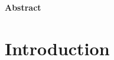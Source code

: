 \documentclass[12pt,twoside,openany]{book}
\begin{document}
\pagestyle{empty}

\begin{center}
    {\Large\bfseries Abstract}
\end{center}

\vspace{1cm}



\clearpage





\tableofcontents






\pagestyle{fancy}


\chapter*{Introduction}
\end{document}
